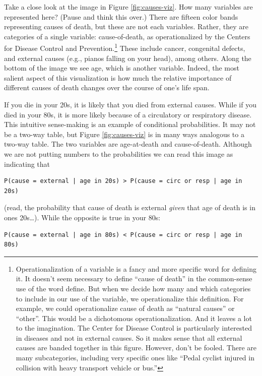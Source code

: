 \documentclass[
  openany]{book}
\begin{document}
Take a close look at the image in Figure \ref{fig:causes-viz}. How many variables are represented here? (Pause and think this over.) There are fifteen color bands representing causes of death, but these are not each variables. Rather, they are categories of a single variable: cause-of-death, as operationalized by the Centers for Disease Control and Prevention.\footnote{Operationalization of a variable is a fancy and more specific word for defining it. It doesn't seem necessary to define ``cause of death'' in the common-sense use of the word define. But when we decide how many and which categories to include in our use of the variable, we operationalize this definition. For example, we could operationalize cause of death as ``natural causes'' or ``other''. This would be a dichotomous operationalization. And it leaves a lot to the imagination. The Center for Disease Control is particularly interested in diseases and not in external causes. So it makes sense that all external causes are banded together in this figure. However, don't be fooled. There are many subcategories, including very specific ones like ``Pedal cyclist injured in collision with heavy transport vehicle or bus.''} These include cancer, congenital defects, and external causes (e.g., pianos falling on your head), among others. Along the bottom of the image we see age, which is another variable. Indeed, the most salient aspect of this visualization is how much the relative importance of different causes of death changes over the course of one's life span.

If you die in your 20s, it is likely that you died from external causes. While if you died in your 80s, it is more likely because of a circulatory or respiratory disease. This intuitive sense-making is an example of conditional probabilities. It may not be a two-way table, but Figure \ref{fig:causes-viz} is in many ways analogous to a two-way table. The two variables are age-at-death and cause-of-death. Although we are not putting numbers to the probabilities we can read this image as indicating that

\begin{verbatim}
P(cause = external | age in 20s) > P(cause = circ or resp | age in 20s)
\end{verbatim}

(read, the probability that cause of death is external \emph{given} that age of death is in ones 20s\ldots).
While the opposite is true in your 80s:

\begin{verbatim}
P(cause = external | age in 80s) < P(cause = circ or resp | age in 80s)
\end{verbatim}
\end{document}
